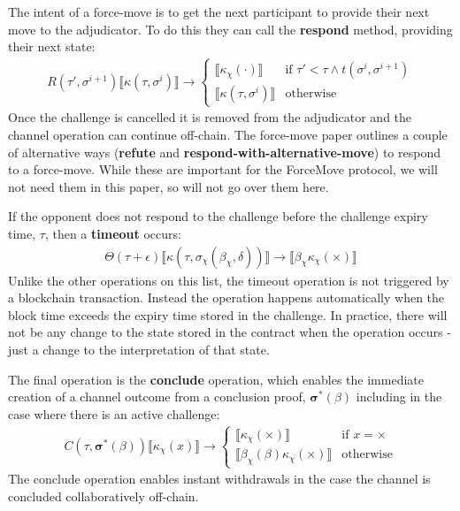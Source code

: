 \documentclass{article}
\theoremstyle{definition}
\newcommand{\adj}[1]{\llbracket #1 \rrbracket}
\begin{document}
The intent of a force-move is to get the next participant to provide their next move to the adjudicator. To do this they can call the \textbf{respond} method, providing their next state:
\begin{align*}
R(\tau', \sigma^{i+1})\adj{\kappa(\tau, \sigma^i)} \rightarrow
\begin{cases}
  \adj{\kappa_\chi(\cdot)} & \text{if } \tau' < \tau \wedge t(\sigma^i, \sigma^{i+1}) \\
  \adj{\kappa(\tau, \sigma^i)} &
  \text{otherwise}
\end{cases}
\end{align*}
Once the challenge is cancelled it is removed from the adjudicator and the channel operation can continue off-chain. The force-move paper \cite{} outlines a couple of alternative ways (\textbf{refute} and \textbf{respond-with-alternative-move}) to respond to a force-move. While these are important for the ForceMove protocol, we will not need them in this paper, so will not go over them here.

If the opponent does not respond to the challenge before the challenge expiry time, $\tau$, then a \textbf{timeout} occurs:
\begin{align*}
\Theta(\tau + \epsilon) \adj{\kappa(\tau, \sigma_\chi(\beta_\chi, \delta))} \rightarrow \adj{\beta_\chi \kappa_\chi(\times)}
\end{align*}
Unlike the other operations on this list, the timeout operation is not triggered by a
blockchain transaction. Instead the operation happens automatically when the block time
exceeds the expiry time stored in the challenge. In practice, there will not be any change 
to the state stored in the contract when the operation occurs - just a change to the
interpretation of that state. 

The final operation is the \textbf{conclude} operation, which enables the immediate creation of a channel outcome from a conclusion proof, $\bm{\sigma}^*(\beta)$ including in the case where there is an active challenge:
\begin{align*}
C(\tau, \bm{\sigma}^*(\beta)) \adj{\kappa_\chi(x)} \rightarrow 
\begin{cases}
  \adj{\kappa_\chi(\times)} & \text{if } x = \times \\
  \adj{\beta_\chi(\beta) \kappa_\chi(\times)} &
  \text{otherwise}
\end{cases}
\end{align*}
The conclude operation enables instant withdrawals in the case the channel is concluded collaboratively off-chain.
\end{document}
